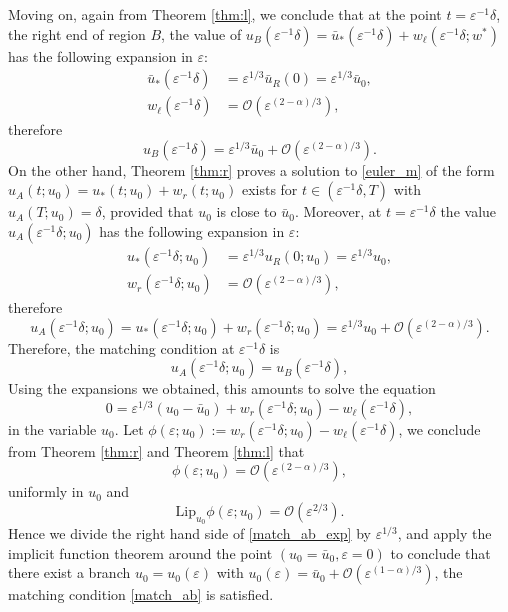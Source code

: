 \documentclass[letterpaper,11pt]{article}
\newcommand{\rmO}{\mathcal{O}}
\newcommand{\eps}{\varepsilon}
\numberwithin{equation}{section}
\theoremstyle{plain}
\begin{document}
Moving on, again from Theorem \ref{thm:l}, we conclude that at the point $t=\eps^{-1}\delta$, the right end of region $B$, the value of $u_B(\eps^{-1}\delta) = \bar{u}_*(\eps^{-1}\delta)  + w_\ell(\eps^{-1}\delta; w^*)$ has the following expansion in $\eps$:
\begin{align*}
\bar{u}_*(\eps^{-1}\delta) &= \eps^{1/3}\bar{u}_R(0) = \eps^{1/3}\bar{u}_0, \\
w_\ell(\eps^{-1}\delta) &=  \rmO(\eps^{(2-\alpha)/3}), 
\end{align*}
therefore
\[
u_B(\eps^{-1}\delta) = \eps^{1/3} \bar{u}_0+\rmO(\eps^{(2-\alpha)/3}).
\]
On the other hand, Theorem \ref{thm:r} proves a solution to \eqref{euler_m} of the form $u_A(t;u_0) = u_*(t; u_0) + w_r(t; u_0)$ exists for $ t \in (\eps^{-1}\delta, T)$ with $u_A(T;u_0) = \delta$, provided that $u_0$ is close to $\bar{u}_0$. Moreover, at $t=\eps^{-1}\delta$ the value $u_A(\eps^{-1}\delta; u_0)$ has the following expansion in $\eps$:
\begin{align*}
u_*(\eps^{-1}\delta; u_0) &= \eps^{1/3}u_R(0;u_0) =  \eps^{1/3}u_0,\\
w_r(\eps^{-1}\delta ; u_0) &= \rmO(\eps^{(2-\alpha)/3}),
\end{align*}
therefore
\[
u_A(\eps^{-1}\delta; u_0 ) = u_*(\eps^{-1}\delta; u_0)+ w_r(\eps^{-1}\delta ; u_0)=\eps^{1/3}u_0 + \rmO(\eps^{(2-\alpha)/3}).
\]
Therefore, the matching condition at $\eps^{-1}\delta$ is
\begin{equation}\label{match_ab}
u_A(\eps^{-1}\delta; u_0) = u_B(\eps^{-1}\delta),
\end{equation}
Using the expansions we obtained, this amounts to solve the equation
\begin{equation}\label{match_ab_exp}
0= \eps^{1/3}(u_0 - \bar{u}_0) + w_r(\eps^{-1}\delta; u_0)-w_\ell(\eps^{-1}\delta),
\end{equation}
in the variable $u_0$.
Let $\phi(\eps; u_0) :=  w_r(\eps^{-1}\delta; u_0)-w_\ell(\eps^{-1}\delta)$, we conclude from Theorem \ref{thm:r} and Theorem \ref{thm:l} that
\[
\phi(\eps; u_0) = \rmO(\eps^{(2-\alpha)/3}), 
\]
uniformly in $u_0$ and 
\[
\text{Lip}_{u_0} \phi(\eps; u_0) = \rmO(\eps^{2/3}).
\]
Hence we divide the right hand side of \eqref{match_ab_exp} by $\eps^{1/3}$, and apply the implicit function theorem around the point $(u_0=\bar{u}_0, \eps=0)$ to conclude that there exist a branch $u_0 = u_0(\eps)$ with $u_0(\eps)  = \bar{u}_0 + \rmO(\eps^{(1-\alpha)/3})$, the matching condition \eqref{match_ab} is satisfied. 
\end{document}
